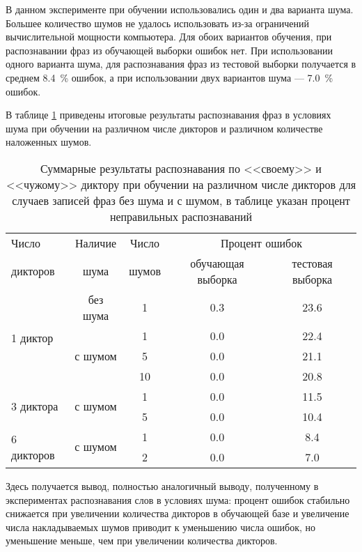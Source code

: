 В данном эксперименте при обучении использовались один и два варианта шума.
Большее количество шумов не удалось использовать из-за ограничений вычислительной мощности компьютера.
Для обоих вариантов обучения, при распознавании фраз из обучающей выборки ошибок нет.
При использовании одного варианта шума, для распознавания фраз из тестовой выборки получается в среднем 8.4~\% ошибок, а при использовании двух вариантов шума --- 7.0~\% ошибок.

В таблице \ref{tab:cnn_phrases_with_noise_summary} приведены итоговые результаты распознавания фраз в условиях шума при обучении на различном числе дикторов и различном количестве наложенных шумов.

\begin{table}[h]
	\centering
	\caption{Суммарные результаты распознавания по <<своему>> и <<чужому>> диктору при обучении на различном числе дикторов для случаев записей фраз без шума и с шумом, в таблице указан процент неправильных распознаваний}
	\label{tab:cnn_phrases_with_noise_summary}
	\begin{tabular}{| l | c | c | c | c |}
		\hline
		Число				& \phantom{0}Наличие\phantom{0} & \phantom{0} Число \phantom{0} 	& \multicolumn{2}{c|}{Процент ошибок}	\\
		\hhline{~~~--}
		дикторов			& шума  			& шумов 	& обучающая выборка & тестовая выборка	\\
		\hline
		\multirow{4}{*}{1 диктор}	& без шума					& 1				& 0.3 		& 23.6 		\\
		\hhline{~----}
									& \multirow{3}{*}{с шумом}	& 1				& 0.0 		& 22.4  	\\
		\hhline{~~---}
									&							& 5				& 0.0 		& 21.1  	\\
		\hhline{~~---}
									&    						& 10			& 0.0 		& 20.8  	\\
		\hline
		\multirow{2}{*}{3 диктора}	& \multirow{2}{*}{с шумом}	& 1				& 0.0 		& 11.5  	\\
		\hhline{~~---}
									&    						& 5				& 0.0 		& 10.4  	\\
		\hline
		\multirow{2}{*}{6 дикторов}	& \multirow{2}{*}{с шумом}	& 1				& 0.0 		& 8.4  		\\
		\hhline{~~---}
									&    						& 2				& 0.0 		& 7.0  		\\
		\hline
	\end{tabular}
\end{table}

Здесь получается вывод, полностью аналогичный выводу, полученному в экспериментах распознавания слов в условиях шума: процент ошибок стабильно снижается при увеличении количества дикторов в обучающей базе и увеличение числа накладываемых шумов приводит к уменьшению числа ошибок, но уменьшение меньше, чем при увеличении количества дикторов.

